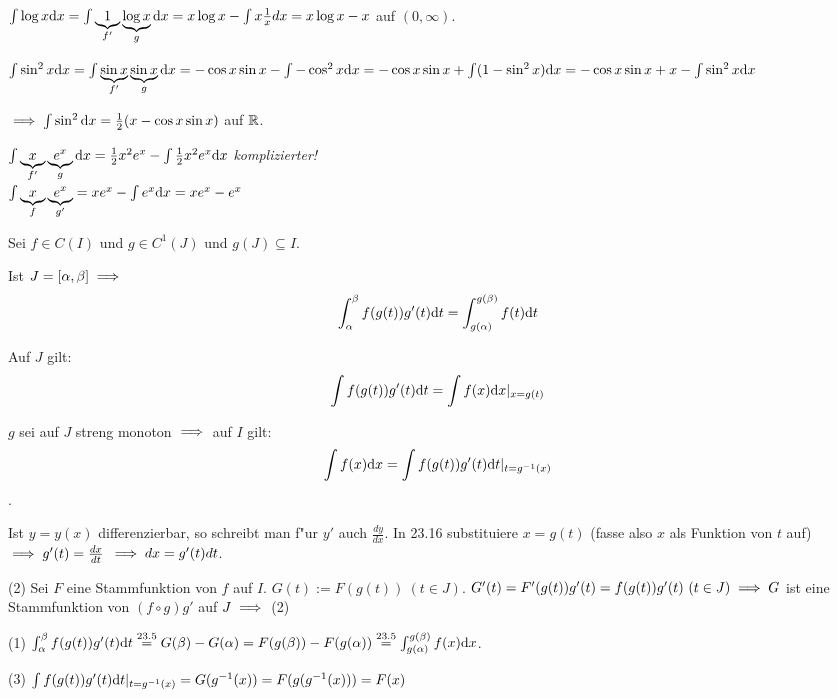 \documentclass[a4paper,twoside,DIV15,BCOR12mm]{scrbook}
\begin{document}
\begin{beispiele}
\item $\int \log x\text{d}x=\int\underbrace{1}_{f'}\underbrace{\log x}_{g}\text{d}x=x\log x-\int x\frac{1}{x}dx=x\log x - x$ auf $(0, \infty)$.
\item $\int \sin^2 x\text{d}x = \int\underbrace{\sin x}_{f'}\underbrace{\sin x}_{g}\text{d}x = -\cos x\sin x - \int{-\cos^2 x\text{d}x}=-\cos x\sin x + \int(1-\sin^2 x)\text{d}x=-\cos x\sin x + x-\int\sin^2 x\text{d}x$

$\implies \int\sin^2\text{d}x =\frac{1}{2}(x-\cos x \sin x)$ auf $\mathbb{R}$.
\item $\int \underbrace{x}_{f'}\underbrace{e^x}_{g}\text{d}x=\frac{1}{2}x^2e^x-\int\frac{1}{2}x^2e^x\text{d}x$ \emph{komplizierter!}\\
$\int\underbrace{x}_{f}\underbrace{e^x}_{g'}=xe^x-\int{e^x\text{d}x}=xe^x-e^x$
\end{beispiele}

\begin{satz}[Substitutionsregeln]
Sei $f\in C(I)$ und $g \in C^1(J)$ und $g(J)\subseteq I$.
\begin{liste}
\item Ist $J=[\alpha, \beta]\implies$ $$\int_{\alpha}^{\beta}f(g(t))g'(t)\text{d}t=\int_{g(\alpha)}^{g(\beta)}f(t)\text{d}t$$
\item Auf $J$ gilt: $$\int f(g(t))g'(t)\text{d}t=\int f(x)\text{d}x|_{x=g(t)}$$
\item $g$ sei auf $J$ streng monoton $\implies$ auf $I$ gilt: $$\int f(x)\text{d}x=\int f(g(t))g'(t)\text{d}t|_{t=g^{-1}(x)}$$.
\end{liste}
\end{satz}

\begin{merkregel}
Ist $y=y(x)$ differenzierbar, so schreibt man f"ur $y'$ auch $\frac{dy}{dx}$. In 23.16 substituiere $x=g(t)$ (fasse also $x$ als Funktion von $t$ auf) $\implies g'(t)=\frac{dx}{dt}$ \glqq$\implies dx=g'(t)dt$\grqq.
\end{merkregel}

\begin{beweise}
\item[(2)]
Sei $F$ eine Stammfunktion von $f$ auf $I$. $G(t):=F(g(t))\ (t\in J)$. $G'(t)=F'(g(t))g'(t)=f(g(t))g'(t)\ (t\in J)\implies G$ ist eine Stammfunktion von $(f\circ g)g'$ auf $J \implies$ (2)
\item[(1)]$\int_{\alpha}^{\beta}f(g(t))g'(t)\text{d}t\overset{23.5}{=}G(\beta)-G(\alpha)=F(g(\beta))-F(g(\alpha))\overset{23.5}{=}\int_{g(\alpha)}^{g(\beta)}f(x)\text{d}x$.
\item[(3)]$\int f(g(t))g'(t)\text{d}t|_{t=g^{-1}(x)}=G(g^{-1}(x))=F(g(g^{-1}(x)))=F(x)$
\end{beweise}
\end{document}
